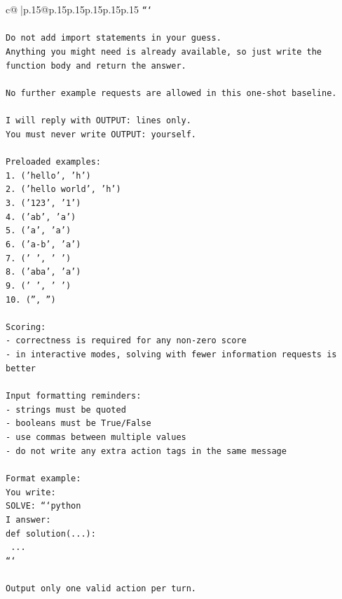 \documentclass{article}
\begin{document}
{\begin{supertabular}{c@{$\;$}|p{.15\linewidth}@{}p{.15\linewidth}p{.15\linewidth}p{.15\linewidth}p{.15\linewidth}p{.15\linewidth}}
{{{\texttt{```} \\
\\ 
\texttt{Do not add import statements in your guess.} \\
\texttt{Anything you might need is already available, so just write the function body and return the answer.} \\
\\ 
\texttt{No further example requests are allowed in this one{-}shot baseline.} \\
\\ 
\texttt{I will reply with OUTPUT: lines only.} \\
\texttt{You must never write OUTPUT: yourself.} \\
\\ 
\texttt{Preloaded examples:} \\
\texttt{1. ('hello', 'h')} \\
\texttt{2. ('hello world', 'h')} \\
\texttt{3. ('123', '1')} \\
\texttt{4. ('ab', 'a')} \\
\texttt{5. ('a', 'a')} \\
\texttt{6. ('a{-}b', 'a')} \\
\texttt{7. (' ', ' ')} \\
\texttt{8. ('aba', 'a')} \\
\texttt{9. ('   ', ' ')} \\
\texttt{10. ('', '')} \\
\\ 
\texttt{Scoring:} \\
\texttt{{-} correctness is required for any non{-}zero score} \\
\texttt{{-} in interactive modes, solving with fewer information requests is better} \\
\\ 
\texttt{Input formatting reminders:} \\
\texttt{{-} strings must be quoted} \\
\texttt{{-} booleans must be True/False} \\
\texttt{{-} use commas between multiple values} \\
\texttt{{-} do not write any extra action tags in the same message} \\
\\ 
\texttt{Format example:} \\
\texttt{You write:} \\
\texttt{SOLVE: ```python} \\
\texttt{I answer:} \\
\texttt{def solution(...):} \\
\texttt{    ...} \\
\texttt{```} \\
\\ 
\texttt{Output only one valid action per turn.} \\
            }
        }
    }
     \\ \\


\end{supertabular}}
\end{document}
